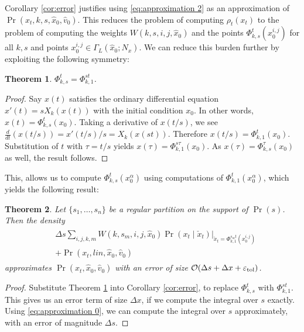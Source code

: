 \documentclass[letterpaper,10pt,conference]{ieeeconf}
\newtheorem{thm}{Theorem}
\begin{document}
Corollary \ref{cor:error} justifies using \eqref{eq:approximation 2} as an approximation of $\Pr( x_t, k,s,\hat{x}_0, \hat{v}_0)$.
This reduces the problem of computing $\rho_t(x_t)$ to the problem of computing the weights $W(k,s,i,j,\hat{x}_0)$ and the points $\Phi_{k,s}^t(x_0^{i,j})$ for all $k,s$ and points $x_0^{i,j} \in \Gamma_L( \hat{x}_0; N_x)$.
We can reduce this burden further by exploiting the following symmetry:
\begin{thm} \label{thm:symmetry}
	$\Phi_{k,s}^t = \Phi_{k,1}^{st}$.
\end{thm}
\begin{proof}
	Say $x(t)$ satisfies the ordinary differential equation $x'(t) = sX_k(x(t))$ with the initial condition $x_0$.
	In other words, $x(t) = \Phi_{k,s}^{t}(x_0)$.
	Taking a derivative of $x(t/s)$, we see $\frac{d}{dt} (x(t/s)) = x'(t/s) /s = X_k(x(st))$.
	Therefore $x(t/s) = \Phi_{k,1}^{t}( x_0)$.
	Substitution of $t$ with $\tau = t/s$ yields $x(\tau) = \Phi_{k,1}^{s \tau} (x_0)$.
	As $x(\tau) = \Phi_{k,s}^{\tau}(x_0)$ as well, the result follows.
\end{proof}
This, allows us to compute $\Phi_{k,s}^t( x_0^{\alpha})$ using computations of $\Phi_{k,1}^t(x_0^{\alpha})$, which yields the following result:
\begin{thm} \label{thm:main}
	Let $\{s_1,\dots,s_n\}$ be a regular partition on the support of $\Pr(s)$.
	Then the density
	\begin{align}
		\begin{split}
		&\Delta s \sum_{i,j,k,m} W(k,s_m,i,j,\hat{x}_0) \left. \Pr( x_t \mid \check{x}_t ) \right|_{ \check{x}_t = \Phi_{k,1}^{s_m t}( x_0^{i,j}) } \\
		&+\Pr( x_t , lin, \hat{x}_0, \hat{v}_0 )
		\end{split}
		\label{eq:approximation 3}
	\end{align}
	approximates $\Pr( x_t, \hat{x}_0, \hat{v}_0)$ with an error of size $\mathcal{O}( \Delta s + \Delta x + \varepsilon_{\rm tol})$.
\end{thm}
\begin{proof}
	Substitute Theorem \ref{thm:symmetry} into Corollary \ref{cor:error}, to replace $\Phi_{k,s}^t$ with $\Phi_{k,1}^{st}$.
	This gives us an error term of size $\Delta x$, if we compute the integral over $s$ exactly.
	Using \eqref{eq:approximation 0}, we can compute the integral over $s$ approximately, with an error of magnitude $\Delta s$.
\end{proof}
\end{document}
